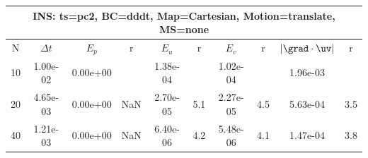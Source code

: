 
\begin{tabular}{|c|c|c|c|c|c|c|c|c|c|} \hline
 \multicolumn{10}{|c|}{INS: ts=pc2, BC=dddt, Map=Cartesian, Motion=translate, MS=none } \\ \hline 
     N  &   $\Delta t$ & $E_p$   &  r  &   $E_u$   &   r    &   $E_v$   & r   &  $|\grad\cdot\uv|$  & r   \\ \hline 
  10   &  1.00e-02  &   0.00e+00  &        &   1.38e-04  &        &   1.02e-04  &        &   1.96e-03  &        \\ 
  20   &  4.65e-03  &   0.00e+00  & NaN  &   2.70e-05  & 5.1  &   2.27e-05  & 4.5  &   5.63e-04  & 3.5  \\ 
  40   &  1.21e-03  &   0.00e+00  & NaN  &   6.40e-06  & 4.2  &   5.48e-06  & 4.1  &   1.47e-04  & 3.8  \\ 
 \hline 
\end{tabular}
